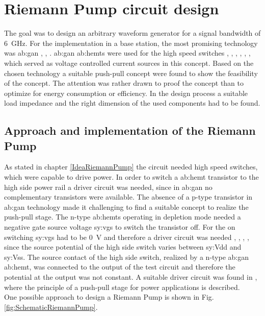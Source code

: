 \chapter{Riemann Pump circuit design}
\label{ch:design}
The goal was to design an arbitrary waveform generator for a signal bandwidth of \SI{6}{\giga \hertz}.
For the implementation in a base station, the most promising technology was \gls{ab:gan} \cite{EvertsDasKeybusJ.EtAl2010}, \cite{PengellyWoodMilliganEtAl2012}, \cite{SchmidReberChartierEtAl2011}.
\gls{ab:gan} \glspl{ab:hemt} were used for the high speed switches  \cite{MaroldtHauptKieferEtAl2009}, \cite{HongMukaiGheidiEtAl2013}, \cite{MaroldtBruecknerQuayEtAl2014}, \cite{WentzelMelianiHeinrich2010}, \cite{MaroldtQuayHauptEtAl2011}, \cite{QuayMaroldt2011}, which served as voltage controlled current sources in this concept.
Based on the chosen technology a suitable push-pull concept were found \cite{MaksimovicPaper} to show the feasibility of the concept.
The attention was rather drawn to proof the concept than to optimize for energy consumption or efficiency.
In the design process a suitable load impedance and the right dimension of the used components had to be found.

\section{Approach and implementation of the Riemann Pump}
As stated in chapter \ref{IdeaRiemannPump} the circuit needed high speed switches, which were capable to drive power.
In order to switch a \gls{ab:hemt} transistor to the high side power rail a driver circuit was needed, since in \gls{ab:gan} no complementary transistors were available.
The absence of a p-type transistor in \gls{ab:gan} technology made it challenging to find a suitable concept to realize the push-pull stage.
The n-type \glspl{ab:hemt} operating in depletion mode needed a negative gate source voltage \gls{sy:vgs} to switch the transistor off.
For the on switching \gls{sy:vgs} had to be \SI{0}{\volt} and therefore a driver circuit was needed \cite{Y.Zhang2015}, \cite{MaksimovicPaper}, \cite{GhoshAltmannKerstenEtAl2014}, \cite{HongMukaiGheidiEtAl2013}, since the source potential of the high side switch varies between \gls{sy:Vdd} and \gls{sy:Vss}.
The source contact of the high side switch, realized by a n-type \gls{ab:gan} \gls{ab:hemt}, was connected to the output of the test circuit and therefore the potential at the output was not constant.
A suitable driver circuit was found in \cite{MaksimovicPaper}, where the principle of a push-pull stage for power applications is described.\\
One possible approach to design a Riemann Pump is shown in Fig. \ref{fig:SchematicRiemannPump}.

